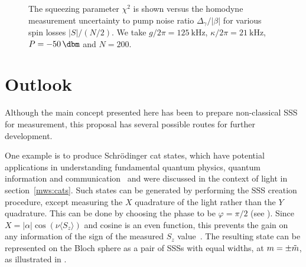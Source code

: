 \begin{figure}[h]
  \centering
  \caption[Relationship of squeezing parameter to measurement uncertainty]{
    The squeezing parameter $\chi^2$ is shown versus the homodyne
  measurement uncertainty to pump noise ratio $\Delta_\gamma/|\beta|$ for
  various spin losses $|S|/(N/2)$. We take
  $g/2\pi = \SI{125}{\kilo\hertz}$, $\kappa/2\pi = \SI{21}{\kilo\hertz}$,
  $P=\SI{-50}{\dbm}$ and $N=200$.
  }
  \label{squeeze:fig:wineland}
\end{figure}

\section{Outlook}

Although the main concept presented here has been to prepare non-classical SSS
for measurement, this proposal has several possible routes for further
development.

One example is to produce Schr\"odinger cat states, which have potential
applications in understanding fundamental quantum physics, quantum information
and communication~\cite{doi:10.1126/science.aay0600} and were discussed in the
context of light in section~\ref{mws:cats}. Such states can be generated by
performing the SSS creation procedure, except measuring the $X$ quadrature of
the light rather than the $Y$ quadrature. This can be done by choosing the
phase to be $\varphi=\pi/2$ (see ).  Since $X =
|\alpha|\cos(\nu \langle S_z \rangle)$ and cosine is an even function, this
prevents the gain on any information of the sign of the measured $S_z$
value~\cite{PhysRevA.56.2249, Zhang2019}. The resulting state can be
represented on the Bloch sphere as a pair of SSSs with equal widths, at
$m=\pm\tilde{m}$, as illustrated in .

